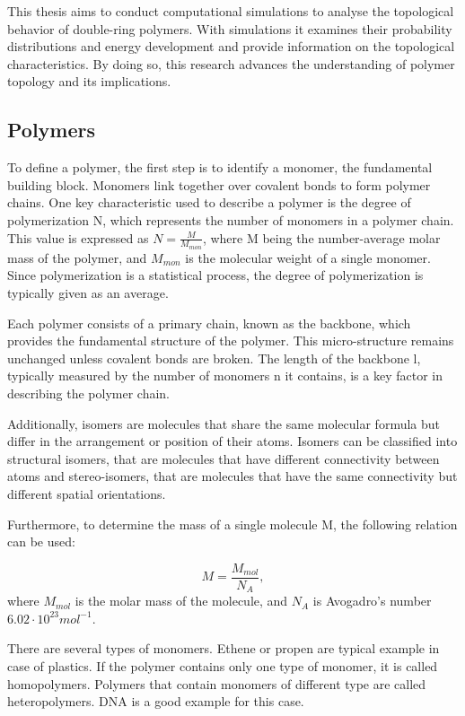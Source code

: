 \documentclass{article}      %
\begin{document}
This thesis aims to conduct computational simulations to analyse the topological behavior of double-ring polymers. With simulations it examines their probability distributions and energy development and provide information on the topological characteristics. By doing so, this research advances the understanding of polymer topology and its implications.

\newpage
  
\subsection{Polymers} 

To define a polymer, the first step is to identify a monomer, the fundamental building block. Monomers link together over covalent bonds to form polymer chains. One key characteristic used to describe a polymer is the degree of polymerization N, which represents the number of monomers in a polymer chain. This value is expressed as $N = \frac{M}{M_{mon}}$, where M being the number-average molar mass of the polymer, and $M_{mon}$ is the molecular weight of a single monomer. Since polymerization is a statistical process, the degree of polymerization is typically given as an average.


Each polymer consists of a primary chain, known as the backbone, which provides the fundamental structure of the polymer. This micro-structure remains unchanged unless covalent bonds are broken. The length of the backbone l, typically measured by the number of monomers n it contains, is a key factor in describing the polymer chain.

Additionally, isomers are molecules that share the same molecular formula but differ in the arrangement or position of their atoms. Isomers can be classified into structural isomers, that are molecules that have different connectivity between atoms and stereo-isomers, that are molecules that have the same connectivity but different spatial orientations.

Furthermore, to determine the mass of a single molecule M, the following relation can be used:

\[
M = \frac{M_{mol}}{N_A},
\]
where $M_{mol}$ is the molar mass of the molecule, and $N_A$ is Avogadro's number $6.02 \cdot 10^{23} mol^{-1}$.

There are several types of monomers. Ethene or propen are typical example in case of plastics. If the polymer contains only one type of monomer, it is called homopolymers. Polymers that contain monomers of different type are called heteropolymers. DNA is a good example for this case.
\end{document}
